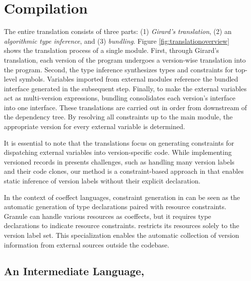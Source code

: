 
\section{Compilation} %
\label{compilation} %


The entire translation consists of three parts: (1) \emph{Girard's translation}, (2) an \emph{algorithmic type inference}, and (3) \emph{bundling}.
Figure \ref{fig:translationoverview} shows the translation process of a single module. First, through Girard's translation, each version of the \mylang{} program undergoes a version-wise translation into the \vlmini{} program. 
Second, the type inference synthesizes types and constraints for top-level symbols. Variables imported from external modules reference the bundled interface generated in the subsequent step.
Finally, to make the external variables act as multi-version expressions, bundling consolidates each version's interface into one \vlmini{} interface.
These translations are carried out in order from downstream of the dependency tree.
By resolving all constraints up to the main module, the appropriate version for every external variable is determined.

It is essential to note that the translations focus on generating constraints for dispatching external variables into version-specific code. While implementing versioned records in \corelang{} presents challenges, such as handling many version labels and their code clones, our method is a constraint-based approach in \vlmini{} that enables static inference of version labels without their explicit declaration.

In the context of coeffect languages, constraint generation in \mylang{} can be seen as the automatic generation of type declarations paired with resource constraints.
Granule\cite{Orchard:2019:Granule} can handle various resources as coeffects, but it requires type declarations to indicate resource constraints. \mylang{} restricts its resources solely to the version label set. This specialization enables the automatic collection of version information from external sources outside the codebase.

\subsection{An Intermediate Language, \vlmini{}}
